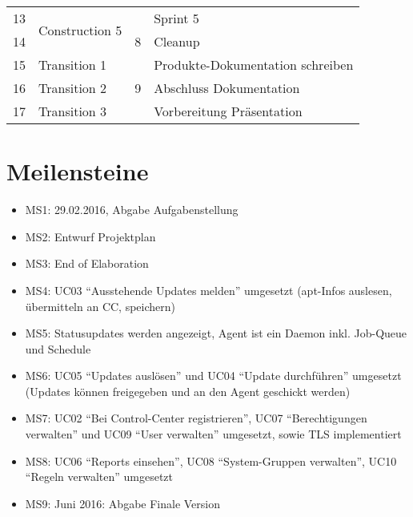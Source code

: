 \begin{table}[H]
\begin{tabular}{| l | l | l | l |}
        13    & \multirow{2}{*}{Construction 5} &             & Sprint 5                                                                   \\
        14    &                                 & 8           & Cleanup                                                                    \\
        15    & Transition 1                    &             & Produkte-Dokumentation schreiben                                           \\
        16    & Transition 2                    & 9           & Abschluss Dokumentation                                                    \\
        17    & Transition 3                    &             & Vorbereitung Präsentation                                                  \\
        \bottomrule
    \end{tabular}
\end{table}


\section{Meilensteine}

\begin{itemize}
    \item MS1: 29.02.2016, Abgabe Aufgabenstellung
    \item MS2: Entwurf Projektplan
    \item MS3: End of Elaboration
    \item MS4: UC03 “Ausstehende Updates melden” umgesetzt (apt-Infos auslesen, übermitteln an CC, speichern)
    \item MS5: Statusupdates werden angezeigt, Agent ist ein Daemon inkl. Job-Queue und Schedule
    \item MS6: UC05 “Updates auslösen” und UC04 “Update durchführen” umgesetzt
	(Updates können freigegeben und an den Agent geschickt werden)
    \item MS7: UC02 “Bei Control-Center registrieren”, UC07 “Berechtigungen verwalten” und UC09 “User verwalten” umgesetzt, sowie TLS implementiert
    \item MS8: UC06 “Reports einsehen”, UC08 “System-Gruppen verwalten”, UC10 “Regeln verwalten” umgesetzt
    \item MS9: Juni 2016: Abgabe Finale Version
\end{itemize}